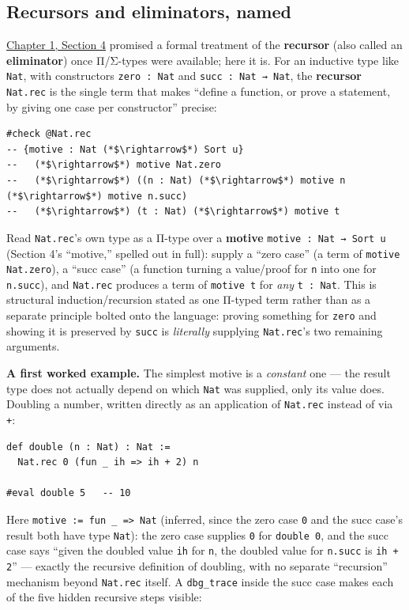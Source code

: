 \subsection{Recursors and eliminators, named}\label{sec:01-basics:05-pi-sigma-and-coc:6}

\hyperref[sec:01-basics:04-terminology:1]{Chapter 1, Section 4} promised a formal treatment of the \textbf{recursor} (also called an \textbf{eliminator}) once Π/Σ-types were available; here it is. For an inductive type like \texttt{Nat}, with constructors \texttt{zero : Nat} and \texttt{succ : Nat → Nat}, the \textbf{recursor} \texttt{Nat.rec} is the single term that makes ``define a function, or prove a statement, by giving one case per constructor'' precise:

\begin{lstlisting}
#check @Nat.rec
-- {motive : Nat (*$\rightarrow$*) Sort u}
--   (*$\rightarrow$*) motive Nat.zero
--   (*$\rightarrow$*) ((n : Nat) (*$\rightarrow$*) motive n (*$\rightarrow$*) motive n.succ)
--   (*$\rightarrow$*) (t : Nat) (*$\rightarrow$*) motive t
\end{lstlisting}

Read \texttt{Nat.rec}'s own type as a Π-type over a \textbf{motive} \texttt{motive : Nat → Sort u} (Section 4's ``motive,'' spelled out in full): supply a ``zero case'' (a term of \texttt{motive Nat.zero}), a ``succ case'' (a function turning a value/proof for \texttt{n} into one for \texttt{n.succ}), and \texttt{Nat.rec} produces a term of \texttt{motive t} for \emph{any} \texttt{t : Nat}. This is structural induction/recursion stated as one Π-typed term rather than as a separate principle bolted onto the language: proving something for \texttt{zero} and showing it is preserved by \texttt{succ} is \emph{literally} supplying \texttt{Nat.rec}'s two remaining arguments.

\textbf{A first worked example.} The simplest motive is a \emph{constant} one --- the result type does not actually depend on which \texttt{Nat} was supplied, only its value does. Doubling a number, written directly as an application of \texttt{Nat.rec} instead of via \texttt{+}:

\begin{lstlisting}
def double (n : Nat) : Nat :=
  Nat.rec 0 (fun _ ih => ih + 2) n

#eval double 5   -- 10
\end{lstlisting}

Here \texttt{motive := fun \_\allowbreak{} => Nat} (inferred, since the zero case \texttt{0} and the succ case's result both have type \texttt{Nat}): the zero case supplies \texttt{0} for \texttt{double 0}, and the succ case says ``given the doubled value \texttt{ih} for \texttt{n}, the doubled value for \texttt{n.succ} is \texttt{ih + 2}'' --- exactly the recursive definition of doubling, with no separate ``recursion'' mechanism beyond \texttt{Nat.rec} itself. A \texttt{dbg\_\allowbreak{}trace} inside the succ case makes each of the five hidden recursive steps visible:

